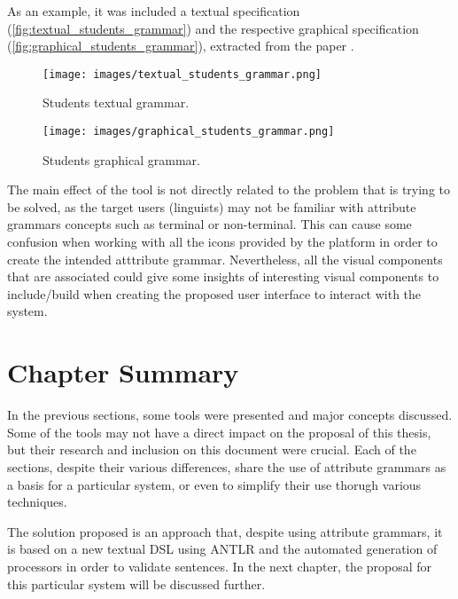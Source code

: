 As an example, it was included a textual specification (\autoref{fig:textual_students_grammar}) 
and the respective graphical specification (\autoref{fig:graphical_students_grammar}), extracted from the paper \cite{oliveira_2009}.
    
\begin{figure}[h]
    \centering
    \texttt{[image: images/textual\_students\_grammar.png]}
    \caption{Students textual grammar.}
    \label{fig:textual_students_grammar}
\end{figure}

\newpage

\begin{figure}[h]
    \centering
    \texttt{[image: images/graphical\_students\_grammar.png]}
    \caption{Students graphical grammar.}
    \label{fig:graphical_students_grammar}
\end{figure}

The main effect of the tool is not directly related to the problem that is trying to be solved, as the target users (linguists) may not be familiar with attribute grammars concepts such as 
terminal or non-terminal.
This can cause some confusion when working with all the icons provided by the platform in order to create the intended atttribute grammar.
Nevertheless, all the visual components that are associated could give some insights of interesting visual components to include/build when creating the proposed user interface to interact with the system.


\section{Chapter Summary} %

In the previous sections, some tools were presented and major concepts discussed.
Some of the tools may not have a direct impact on the proposal of this thesis, but their research and inclusion on this document were crucial.
Each of the sections, despite their various differences, share the use of attribute grammars as a basis for a particular system,
or even to simplify their use thorugh various techniques.

The solution proposed is an approach that, despite using attribute grammars, 
it is based on a new textual \textsc{DSL} using \textsc{ANTLR} and the automated generation of processors in order to validate sentences.
In the next chapter, the proposal for this particular system will be discussed further.


